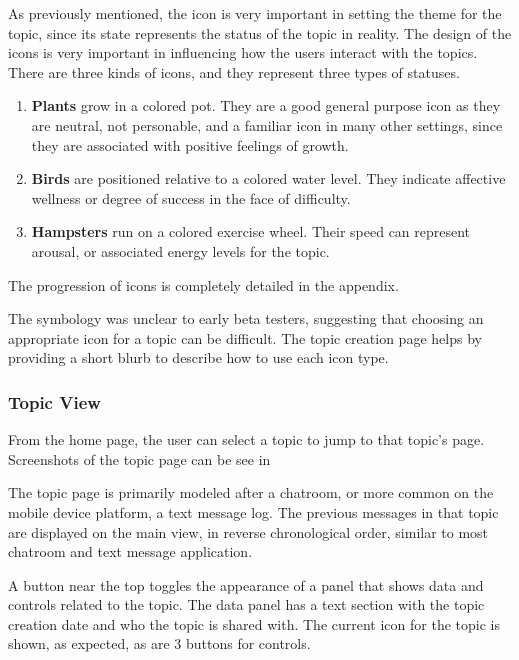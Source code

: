       As previously mentioned, the icon is very important in setting
      the theme for the topic, since its state represents the status of the topic
      in reality.
      The design of the icons is very important in influencing how
      the users interact with the topics. 
      There are three kinds of icons, and they represent three types of statuses.
      \begin{enumerate}
      \item \textbf{Plants} grow in a colored pot. They are a good general purpose icon as they are neutral,
      not personable, and a familiar icon in many other settings,
      since they are associated with positive feelings of growth.
      \item \textbf{Birds} are positioned relative to a colored water level.
      They indicate affective wellness or degree of success in the face of difficulty.
      \item \textbf{Hampsters} run on a colored exercise wheel.
      Their speed can represent arousal,
      or associated energy levels for the topic.
      \end{enumerate}
      The progression of icons is completely detailed in the appendix.

      The symbology was unclear to early beta testers,
      suggesting that choosing an appropriate icon for a topic can be difficult.
      The topic creation page helps by providing
      a short blurb to describe how to use each icon type.

      \subsubsection{Topic View}
      From the home page,
      the user can select a topic to jump to that topic's page.
      Screenshots of the topic page can be see in \cite{}

      The topic page is primarily modeled after a chatroom,
      or more common on the mobile device platform,
      a text message log.
      The previous messages in that topic are displayed on the main view,
      in reverse chronological order, similar to most chatroom and text message application.

      A button near the top toggles the appearance of a panel that shows data and controls
      related to the topic.
      The data panel has a text section with the topic creation date and who the topic is shared with.
      The current icon for the topic is shown, as expected, as are 3 buttons for controls.

